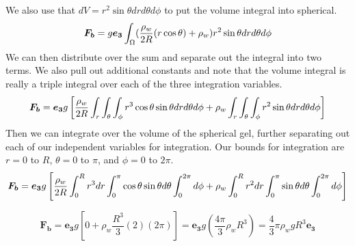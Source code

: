 \documentclass[preprint,12pt,authoryear]{elsarticle}
\begin{document}
We also use that $dV = r^2 \sin{\theta}drd\theta d\phi$ to put the volume integral into spherical.
\begin{equation}
    \bm{F_b}=g\bm{e_3} \int_{\Omega}  (\frac{\rho_w}{2 R}(r\cos{\theta}) + \rho_w) \space r^2 \sin{\theta} \space drd\theta d\phi
\end{equation}
We can then distribute over the sum and separate out the integral into two terms. We also pull out additional constants and note that the volume integral is really a triple integral over each of the three integration variables.
\begin{equation}
    \bm{F_b} = \bm{e_3}g \left[ \frac{\rho_w}{2 R} \int_{r} \int_{\theta} \int_{\phi}r^3 \cos{\theta}\sin{\theta} \space drd\theta d\phi + \rho_w\int_{r} \int_{\theta} \int_{\phi} r^2 \sin{\theta} \space drd\theta d\phi \right]
\end{equation}
Then we can integrate over the volume of the spherical gel, further separating out each of our independent variables for integration. Our bounds for integration are $r=0$ to $R$, $\theta=0$ to $\pi$, and $\phi = 0$ to $2\pi$.
\begin{equation}
    \bm{F_b} = \bm{e_3}g \left[ \frac{\rho_w}{2 R} \int_{0}^{R} r^3 dr\int_{0}^{\pi} \cos{\theta}\sin{\theta} \space d\theta\int_{0}^{2\pi} d\phi  + \rho_w\int_{0}^{R} r^2 dr\int_{0}^{\pi}\sin{\theta} \space d\theta\int_{0}^{2\pi} d\phi\right]
\end{equation}

\begin{equation}
    \bm{F_b} = \bm{e_3}g \left[ 0  + \rho_w \frac{R^3}{3}(2)(2\pi) \right] = \bm{e_3}g \left(\frac{4\pi}{3} \rho_w R^3 \right) = \frac{4}{3}\pi\rho_w g R^3 \bm{e_3}
\end{equation}
\end{document}
